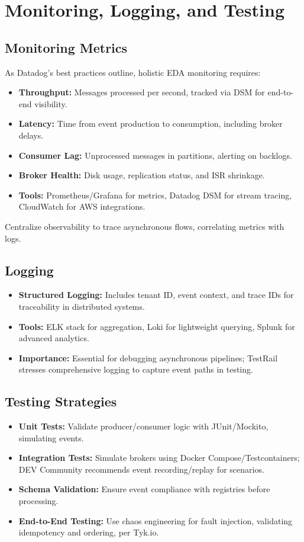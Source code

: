 \documentclass[12pt,a4paper]{report}
\begin{document}
\chapter{Monitoring, Logging, and Testing}
\section{Monitoring Metrics}
As Datadog's best practices outline, holistic EDA monitoring requires:
\begin{itemize}
    \item \textbf{Throughput:} Messages processed per second, tracked via DSM for end-to-end visibility.
    \item \textbf{Latency:} Time from event production to consumption, including broker delays.
    \item \textbf{Consumer Lag:} Unprocessed messages in partitions, alerting on backlogs.
    \item \textbf{Broker Health:} Disk usage, replication status, and ISR shrinkage.
    \item \textbf{Tools:} Prometheus/Grafana for metrics, Datadog DSM for stream tracing, CloudWatch for AWS integrations.
\end{itemize}

Centralize observability to trace asynchronous flows, correlating metrics with logs.

\section{Logging}
\begin{itemize}
    \item \textbf{Structured Logging:} Includes tenant ID, event context, and trace IDs for traceability in distributed systems.
    \item \textbf{Tools:} ELK stack for aggregation, Loki for lightweight querying, Splunk for advanced analytics.
    \item \textbf{Importance:} Essential for debugging asynchronous pipelines; TestRail stresses comprehensive logging to capture event paths in testing.
\end{itemize}

\section{Testing Strategies}
\begin{itemize}
    \item \textbf{Unit Tests:} Validate producer/consumer logic with JUnit/Mockito, simulating events.
    \item \textbf{Integration Tests:} Simulate brokers using Docker Compose/Testcontainers; DEV Community recommends event recording/replay for scenarios.
    \item \textbf{Schema Validation:} Ensure event compliance with registries before processing.
    \item \textbf{End-to-End Testing:} Use chaos engineering for fault injection, validating idempotency and ordering, per Tyk.io.
\end{itemize}
\end{document}
